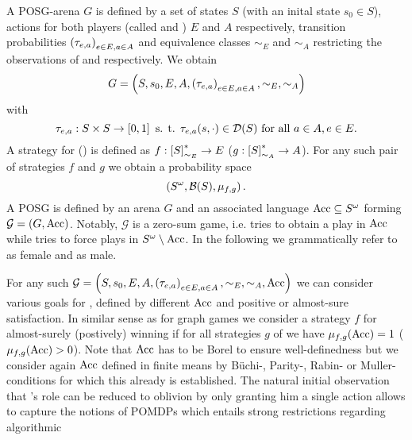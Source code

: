 \begin{definition}
  A \ac{POSG}-arena $G$ is defined by a set of states $S$ (with an 
  inital state $s_{0}\in S$), actions for both players (called \eve{} and 
  \adam{}) $E$ and $A$ respectively, transition probabilities 
  $\left(\tau_{e,a}\right)_{e\in E, a\in A}$ and equivalence classes $\sim_{E}$ and 
  $\sim_{A}$ restricting the observations of \eve{} and \adam{} respectively. 
  We obtain
  \begin{equation*}
    G = \left(S, s_{0}, E, A, \left(\tau_{e,a}\right)_{e\in E, a\in A}, 
    \sim_{E}, \sim_{A}\right)
  \end{equation*}
  with
  \begin{equation*}
    \tau_{e,a}:S\times S\rightarrow\left[0,1\right] \text{ s. t. }
    \tau_{e,a}(s, \cdot)\in\mathcal{D}(S)\text{ for all }a\in A, e\in E.
  \end{equation*}
  A strategy for \eve{} (\adam{}) is defined as 
  $f:\left[S\right]_{\sim_{E}}^{*}\rightarrow E$ 
  ($g:\left[S\right]_{\sim_{A}}^{*}\rightarrow A$). For any such pair of 
  strategies $f$ and $g$ we obtain a probability space
  \begin{equation*}
    \left(S^{\omega}, \mathcal{B}(S), \mu_{f, g}\right).
  \end{equation*}
  A \ac{POSG} is defined by an arena $G$ and an associated language
  $\operatorname{Acc}\subseteq S^{\omega}$ forming $\mathcal{G} = \left(G, \operatorname{Acc}\right)$. Notably,
  $\mathcal{G}$ is a zero-sum game, i.e. \eve{} tries to obtain a play in 
  $\operatorname{Acc}$ while \adam{} tries to force plays in $S^{\omega}\setminus\operatorname{Acc}$. In 
  the following we grammatically refer to \eve{} as female and \adam{} as male.
\end{definition}
For any such $\mathcal{G} = \left(
S, s_{0}, E, A, \left(\tau_{e,a}\right)_{e\in E, a\in A}, \sim_{E}, \sim_{A}, \operatorname{Acc}\right)$ 
we can consider various goals for \eve{}, defined by different $\operatorname{Acc}$ and
positive or almost-sure satisfaction. In similar sense as for graph games we
consider a strategy $f$ for \eve{} almost-surely (postively) winning if for all
strategies $g$ of \adam{} we have $\mu_{f,g}(\operatorname{Acc}) = 1$ 
($\mu_{f,g}(\operatorname{Acc}) > 0$). Note that $\operatorname{Acc}$ has to be Borel to ensure 
well-definedness but we consider again $\operatorname{Acc}$ defined in finite means by 
Büchi-, Parity-, Rabin- or Muller-conditions for which this already is 
established. The natural initial observation that \adam{}'s role can be reduced 
to oblivion by only granting him a single action allows to capture the notions
of \acp{POMDP} which entails strong restrictions regarding algorithmic 
